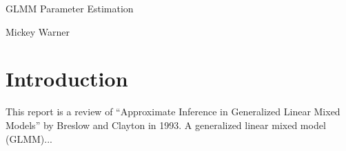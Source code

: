 \documentclass[12pt]{article}
\begin{document}
\begin{Large}
\begin{center}
GLMM Parameter Estimation
\bigskip

Mickey Warner
\end{center}
\end{Large}

\section*{Introduction}

\noindent This report is a review of ``Approximate Inference in Generalized Linear Mixed Models'' by Breslow and Clayton in 1993. A generalized linear mixed model (GLMM)...
\end{document}
